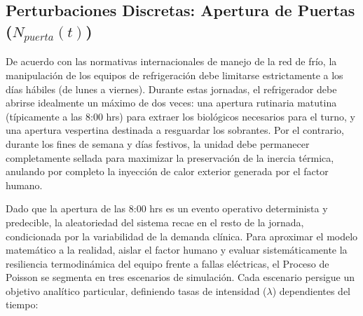 \documentclass[
  spanish,
  letterpaper,
  DIV=11,
  numbers=noendperiod]{scrreprt}
\theoremstyle{plain}
\theoremstyle{plain}
\theoremstyle{plain}
\theoremstyle{definition}
\theoremstyle{remark}
\begin{document}
\subsection{\texorpdfstring{Perturbaciones Discretas: Apertura de
Puertas
(\(N_{puerta}(t)\))}{Perturbaciones Discretas: Apertura de Puertas (N\_\{puerta\}(t))}}\label{sec-perturbaciones-discretas}

De acuerdo con las normativas internacionales de manejo de la red de
frío, la manipulación de los equipos de refrigeración debe limitarse
estrictamente a los días hábiles (de lunes a viernes). Durante estas
jornadas, el refrigerador debe abrirse idealmente un máximo de dos
veces: una apertura rutinaria matutina (típicamente a las 8:00 hrs) para
extraer los biológicos necesarios para el turno, y una apertura
vespertina destinada a resguardar los sobrantes. Por el contrario,
durante los fines de semana y días festivos, la unidad debe permanecer
completamente sellada para maximizar la preservación de la inercia
térmica, anulando por completo la inyección de calor exterior generada
por el factor humano.

Dado que la apertura de las 8:00 hrs es un evento operativo determinista
y predecible, la aleatoriedad del sistema recae en el resto de la
jornada, condicionada por la variabilidad de la demanda clínica. Para
aproximar el modelo matemático a la realidad, aislar el factor humano y
evaluar sistemáticamente la resiliencia termodinámica del equipo frente
a fallas eléctricas, el Proceso de Poisson se segmenta en tres
escenarios de simulación. Cada escenario persigue un objetivo analítico
particular, definiendo tasas de intensidad (\(\lambda\)) dependientes
del tiempo:
\end{document}
